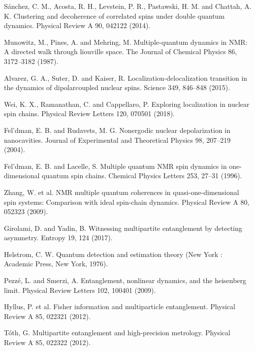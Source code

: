\documentclass[utf8]{jetp}
\begin{document}
\begin{thebibliography}{35}
S\'anchez, C. M., Acosta, R. H., Levstein, P. R., Pastawski, H. M. and  Chattah, A. K. Clustering and decoherence of correlated spins under double quantum dynamics. Physical Review A 90, 042122 (2014).

Munowitz, M., Pines, A. and  Mehring, M. Multiple-quantum dynamics in NMR: A directed walk through liouville space. The Journal of Chemical Physics 86, 3172–3182 (1987).

Alvarez, G. A., Suter, D. and  Kaiser, R. Localization-delocalization transition in the dynamics of dipolarcoupled nuclear spins. Science 349, 846–848 (2015).

Wei, K. X., Ramanathan, C. and  Cappellaro, P. Exploring localization in nuclear spin chains. Physical Review Letters 120, 070501 (2018).

Fel’dman, E. B. and  Rudavets, M. G. Nonergodic nuclear depolarization in nanocavities. Journal of
Experimental and Theoretical Physics 98, 207–219 (2004).

Fel’dman, E. B. and  Lacelle, S. Multiple quantum NMR spin dynamics in one-dimensional quantum spin
chains. Chemical Physics Letters 253, 27–31 (1996).

Zhang, W. et al. NMR multiple quantum coherences in quasi-one-dimensional spin systems: Comparison
with ideal spin-chain dynamics. Physical Review A 80, 052323 (2009).

Girolami, D. and  Yadin, B. Witnessing multipartite entanglement by detecting asymmetry. Entropy 19, 124
(2017).

Helstrom, C. W. Quantum detection and estimation theory (New York : Academic Press, New York, 1976).

Pezz\'e, L. and Smerzi, A. Entanglement, nonlinear dynamics, and the heisenberg limit. Physical Review
Letters 102, 100401 (2009).

Hyllus, P. et al. Fisher information and multiparticle entanglement. Physical Review A 85, 022321 (2012).

T\'oth, G. Multipartite entanglement and high-precision metrology. Physical Review A 85, 022322 (2012).
\end{thebibliography}
\end{document}
